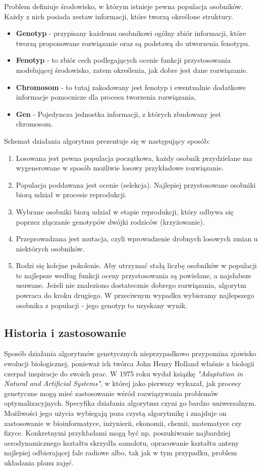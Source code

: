 \par Problem definiuje środowisko, w którym istnieje pewna populacja osobników. Każdy z nich posiada zestaw informacji, które tworzą określone struktury.
\begin {itemize}
\item \textbf{Genotyp} - przypisany każdemu osobnikowi ogólny zbiór informacji, które tworzą proponowane rozwiązanie oraz są podstawą do utworzenia fenotypu.
\item \textbf{Fenotyp} - to zbiór cech podlegających ocenie funkcji przystosowania modelującej środowisko, zatem określenia, jak dobre jest dane rozwiązanie.
\item \textbf{Chromosom} - to tutaj zakodowany jest fenotyp i ewentualnie dodatkowe informacje pomocnicze dla procesu tworzenia rozwiązania.
\item \textbf{Gen} - Pojedyncza jednostka informacji, z których zbudowany jest chromosom.
\end{itemize}
\par Schemat działania algorytmu prezentuje się w następujący sposób:
\begin{enumerate}
\item Losowana jest pewna populacja początkowa, każdy osobnik przydzielane ma wygenerowane w sposób możliwie losowy przykładowe rozwiązanie.
\item Populacja poddawana jest ocenie (selekcja). Najlepiej przystosowane osobniki biorą udział w procesie reprodukcji.
\item Wybrane osobniki biorą udział w etapie reprodukcji, który odbywa się poprzez  złączanie genotypów dwójki rodziców (krzyżowanie).
\item Przeprowadzana jest mutacja, czyli wprowadzenie drobnych losowych zmian u niektórych osobników.
\item Rodzi się kolejne pokolenie. Aby utrzymać stałą liczbę osobników w populacji te najlepsze według funkcji oceny przystosowania są powielane, a najsłabsze usuwane. Jeżeli nie znaleziono dostatecznie dobrego rozwiązania, algorytm powraca do kroku drugiego. W przeciwnym wypadku wybieramy najlepszego osobnika z populacji - jego genotyp to uzyskany wynik.
\end{enumerate}
\subsection{Historia i zastosowanie}
Sposób działania algorytmów genetycznych nieprzypadkowo przypomina zjawisko ewolucji biologicznej, ponieważ ich twórca John Henry Holland właśnie z biologii czerpał inspiracje do swoich prac. W 1975 roku wydał książkę \emph{"Adaptation in Natural and Artificial Systems"}, w której jako pierwszy wykazał, jak procesy genetyczne mogą mieć zastosowanie wśród rozwiązywania problemów optymalizacyjnych. Specyfika działania algorytmu czyni go bardzo uniwersalnym. Możliwości jego użycia wybiegają poza czystą algorytmikę i znajduje on zastosowanie w bioinformatyce, inżynierii, ekonomii, chemii, matematyce czy fizyce. Konkretnymi przykładami mogą być np. poszukiwanie najbardziej aerodynamicznego kształtu skrzydła samolotu, opracowanie kształtu anteny najlepiej odbierającej fale radiowe albo, tak jak w tym przypadku, problem układania planu zajęć.
